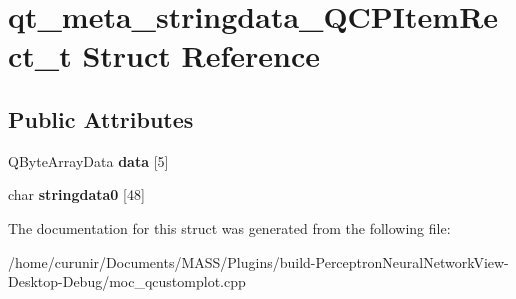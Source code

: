 \hypertarget{structqt__meta__stringdata___q_c_p_item_rect__t}{}\section{qt\+\_\+meta\+\_\+stringdata\+\_\+\+Q\+C\+P\+Item\+Rect\+\_\+t Struct Reference}
\label{structqt__meta__stringdata___q_c_p_item_rect__t}
\subsection*{Public Attributes}
\begin{DoxyCompactItemize}
\item 
Q\+Byte\+Array\+Data {\bfseries data} \mbox{[}5\mbox{]}\hypertarget{structqt__meta__stringdata___q_c_p_item_rect__t_ab5a84b5db36cb982466a0b732f5e090f}{}\label{structqt__meta__stringdata___q_c_p_item_rect__t_ab5a84b5db36cb982466a0b732f5e090f}

\item 
char {\bfseries stringdata0} \mbox{[}48\mbox{]}\hypertarget{structqt__meta__stringdata___q_c_p_item_rect__t_a216a9c8bff154ce0d04ce8eb79a5d408}{}\label{structqt__meta__stringdata___q_c_p_item_rect__t_a216a9c8bff154ce0d04ce8eb79a5d408}

\end{DoxyCompactItemize}


The documentation for this struct was generated from the following file\+:\begin{DoxyCompactItemize}
\item 
/home/curunir/\+Documents/\+M\+A\+S\+S/\+Plugins/build-\/\+Perceptron\+Neural\+Network\+View-\/\+Desktop-\/\+Debug/moc\+\_\+qcustomplot.\+cpp\end{DoxyCompactItemize}

